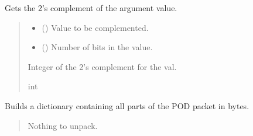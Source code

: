 \documentclass[letterpaper,10pt,english]{sphinxmanual}
\begin{document}
\begin{fulllineitems}

\begin{fulllineitems}
\label{\detokenize{PodApi.Packets:PodApi.Packets.Packet.Packet.TwosComplement}}
\pysigstartsignatures
{}
\pysigstopsignatures
\sphinxAtStartPar
Gets the 2’s complement of the argument value.
\begin{quote}\begin{description}
\begin{itemize}
\item {} 
\sphinxAtStartPar
{} () \textendash{} Value to be complemented.

\item {} 
\sphinxAtStartPar
{} () \textendash{} Number of bits in the value.

\end{itemize}

\sphinxAtStartPar
Integer of the 2’s complement for the val.

\sphinxAtStartPar
int

\end{description}\end{quote}

\end{fulllineitems}


\begin{fulllineitems}
\label{\detokenize{PodApi.Packets:PodApi.Packets.Packet.Packet.UnpackAll}}
\pysigstartsignatures
{}
\pysigstopsignatures
\sphinxAtStartPar
Builds a dictionary containing all parts of the POD packet in bytes.
\begin{quote}\begin{description}
\sphinxAtStartPar
{} \textendash{} Nothing to unpack.


\end{description}
\end{quote}
\end{fulllineitems}
\end{fulllineitems}
\end{document}

